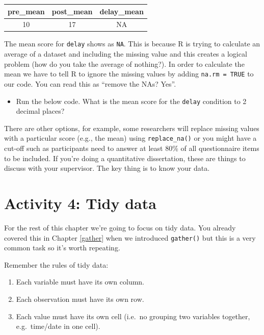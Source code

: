 \documentclass[]{book}
\providecommand{\tightlist}{%
  \setlength{\itemsep}{0pt}\setlength{\parskip}{0pt}}
\begin{document}
\begin{tabular}{c|c|c}
\hline
pre\_mean & post\_mean & delay\_mean\\
\hline
10 & 17 & NA\\
\hline
\end{tabular}

The mean score for \texttt{delay} shows as \texttt{NA}. This is because R is trying to calculate an average of a dataset and including the missing value and this creates a logical problem (how do you take the average of nothing?). In order to calculate the mean we have to tell R to ignore the missing values by adding \texttt{na.rm\ =\ TRUE} to our code. You can read this as ``remove the NAs? Yes''.

\begin{itemize}
\tightlist
\item
  Run the below code. What is the mean score for the \texttt{delay} condition to 2 decimal places? 
\end{itemize}

There are other options, for example, some researchers will replace missing values with a particular score (e.g., the mean) using \texttt{replace\_na()} or you might have a cut-off such as participants need to answer at least 80\% of all questionnaire items to be included. If you're doing a quantitative dissertation, these are things to discuss with your supervisor. The key thing is to know your data.

\hypertarget{activity-4-tidy-data}{%
\section{Activity 4: Tidy data}\label{activity-4-tidy-data}}

For the rest of this chapter we're going to focus on tidy data. You already covered this in Chapter \ref{gather} when we introduced \texttt{gather()} but this is a very common task so it's worth repeating.

Remember the rules of tidy data:

\begin{enumerate}
\def\labelenumi{\arabic{enumi}.}
\tightlist
\item
  Each variable must have its own column.
\item
  Each observation must have its own row.
\item
  Each value must have its own cell (i.e.~no grouping two variables together, e.g.~time/date in one cell).
\end{enumerate}
\end{document}
